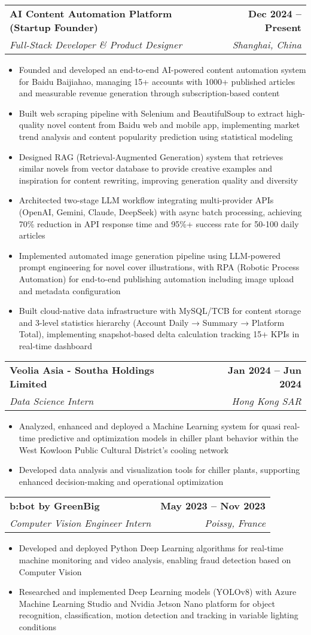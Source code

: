 \documentclass[letterpaper,11pt]{article}
\makeatletter
\newcommand{\resumeItem}[1]{
  \item\small{
    {#1 \vspace{-2pt}}
  }
}
\newcommand{\resumeSubheading}[4]{
  \vspace{-2pt}\item
    \begin{tabular*}{1.0\textwidth}[t]{l@{\extracolsep{\fill}}r}
      \textbf{#1} & \textbf{\small #2} \\
      \textit{\small#3} & \textit{\small #4} \\
    \end{tabular*}\vspace{-7pt}
}
\newcommand{\resumeItemListStart}{\begin{itemize}}
\newcommand{\resumeItemListEnd}{\end{itemize}\vspace{-5pt}}
\makeatother
\begin{document}
    \resumeSubheading
    {AI Content Automation Platform (Startup Founder)}{Dec 2024 -- Present}
    {Full-Stack Developer \& Product Designer}{Shanghai, China}
      \resumeItemListStart
        \resumeItem{Founded and developed an end-to-end AI-powered content automation system for Baidu Baijiahao, managing 15+ accounts with 1000+ published articles and measurable revenue generation through subscription-based content}
        \resumeItem{Built web scraping pipeline with Selenium and BeautifulSoup to extract high-quality novel content from Baidu web and mobile app, implementing market trend analysis and content popularity prediction using statistical modeling}
        \resumeItem{Designed RAG (Retrieval-Augmented Generation) system that retrieves similar novels from vector database to provide creative examples and inspiration for content rewriting, improving generation quality and diversity}
        \resumeItem{Architected two-stage LLM workflow integrating multi-provider APIs (OpenAI, Gemini, Claude, DeepSeek) with async batch processing, achieving 70\% reduction in API response time and 95\%+ success rate for 50-100 daily articles}
        \resumeItem{Implemented automated image generation pipeline using LLM-powered prompt engineering for novel cover illustrations, with RPA (Robotic Process Automation) for end-to-end publishing automation including image upload and metadata configuration}
        \resumeItem{Built cloud-native data infrastructure with MySQL/TCB for content storage and 3-level statistics hierarchy (Account Daily → Summary → Platform Total), implementing snapshot-based delta calculation tracking 15+ KPIs in real-time dashboard}
      \resumeItemListEnd

    \resumeSubheading
    {Veolia Asia - Southa Holdings Limited}{Jan 2024 -- Jun 2024}
    {Data Science Intern}{Hong Kong SAR}
      \resumeItemListStart
        \resumeItem{Analyzed, enhanced and deployed a Machine Learning system for quasi real-time predictive and optimization models in chiller plant behavior within the West Kowloon Public Cultural District's cooling network}
        \resumeItem{Developed data analysis and visualization tools for chiller plants, supporting enhanced decision-making and operational optimization}
      \resumeItemListEnd

    \resumeSubheading
    {b:bot by GreenBig}{May 2023 -- Nov 2023}
    {Computer Vision Engineer Intern}{Poissy, France}
      \resumeItemListStart
        \resumeItem{Developed and deployed Python Deep Learning algorithms for real-time machine monitoring and video analysis, enabling fraud detection based on Computer Vision}
        \resumeItem{Researched and implemented Deep Learning models (YOLOv8) with Azure Machine Learning Studio and Nvidia Jetson Nano platform for object recognition, classification, motion detection and tracking in variable lighting conditions}
      \resumeItemListEnd
\end{document}
